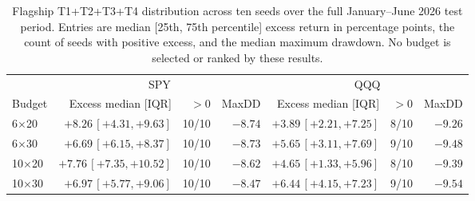 \begin{table}[t]
\caption{Flagship T1+T2+T3+T4 distribution across ten seeds over the full January--June 2026 test period. Entries are median [25th, 75th percentile] excess return in percentage points, the count of seeds with positive excess, and the median maximum drawdown. No budget is selected or ranked by these results.}
\label{tab:budget}
\centering
\small
\begin{tabular}{lrrrrrr}
\toprule
& \multicolumn{3}{c}{SPY} & \multicolumn{3}{c}{QQQ} \\
\cmidrule(lr){2-4}\cmidrule(lr){5-7}
Budget & Excess median [IQR] & $>0$ & MaxDD & Excess median [IQR] & $>0$ & MaxDD \\
\midrule
6$\times$20 & $+8.26\,[+4.31,+9.63]$ & 10/10 & $-8.74$ & $+3.89\,[+2.21,+7.25]$ & 8/10 & $-9.26$ \\
6$\times$30 & $+6.69\,[+6.15,+8.37]$ & 10/10 & $-8.73$ & $+5.65\,[+3.11,+7.69]$ & 9/10 & $-9.48$ \\
10$\times$20 & $+7.76\,[+7.35,+10.52]$ & 10/10 & $-8.62$ & $+4.65\,[+1.33,+5.96]$ & 8/10 & $-9.39$ \\
10$\times$30 & $+6.97\,[+5.77,+9.06]$ & 10/10 & $-8.47$ & $+6.44\,[+4.15,+7.23]$ & 9/10 & $-9.54$ \\
\bottomrule
\end{tabular}
\end{table}
